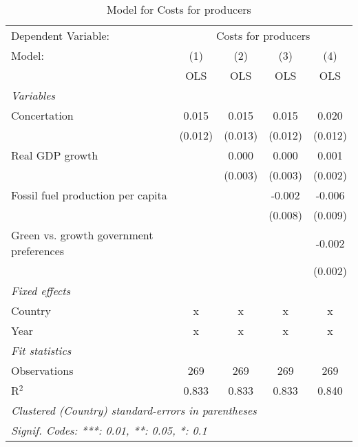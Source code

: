
\begin{table}[htbp]
   \caption{Model for Costs for producers}
   \centering
   \begin{tabular}{lcccc}
      \toprule
      Dependent Variable: & \multicolumn{4}{c}{Costs for producers}\\
      Model:                                  & (1)     & (2)     & (3)     & (4)\\  
                                              &  OLS    & OLS     & OLS     & OLS\\  
      \midrule
      \emph{Variables}\\
      Concertation                            & 0.015   & 0.015   & 0.015   & 0.020\\   
                                              & (0.012) & (0.013) & (0.012) & (0.012)\\   
      Real GDP growth                         &         & 0.000   & 0.000   & 0.001\\   
                                              &         & (0.003) & (0.003) & (0.002)\\   
      Fossil fuel production per capita       &         &         & -0.002  & -0.006\\   
                                              &         &         & (0.008) & (0.009)\\   
      Green vs. growth government preferences &         &         &         & -0.002\\   
                                              &         &         &         & (0.002)\\   
      \emph{Fixed effects}\\
      Country                                 & x       & x       & x       & x\\  
      Year                                    & x       & x       & x       & x\\  
      \midrule \emph{Fit statistics}\\
      Observations                            & 269     & 269     & 269     & 269\\  
      R$^2$                                   & 0.833   & 0.833   & 0.833   & 0.840\\  
      \midrule
      \multicolumn{5}{l}{\emph{Clustered (Country) standard-errors in parentheses}}\\
      \multicolumn{5}{l}{\emph{Signif. Codes: ***: 0.01, **: 0.05, *: 0.1}}\\
   \end{tabular}
\end{table}


